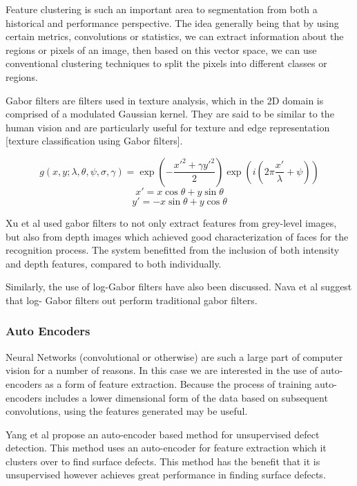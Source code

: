 \documentclass[a4]{article}
\begin{document}
Feature clustering is such an important area to segmentation from both a historical and performance perspective. The idea generally being that by using certain metrics, convolutions or statistics, we can extract information about the regions or pixels of an image, then based on this vector space, we can use conventional clustering techniques to split the pixels into different classes or regions. 

  

Gabor filters are filters used in texture analysis, which in the 2D domain is comprised of a modulated Gaussian kernel. They are said to be similar to the human vision \cite{jones1987evaluation} and are particularly useful for texture and edge representation [texture classification using Gabor filters]. 

$$g(x,y;\lambda,\theta,\psi,\sigma,\gamma)=\exp \left(-\frac{x'^2+\gamma y'^2}{2}\right) \exp \left( i\left(2\pi \frac{x'}{\lambda}+\psi\right) \right)$$
$$x' = x \cos\theta +y\sin\theta$$
$$y' = -x\sin\theta +y\cos\theta$$

  

Xu et al \cite{xu2009automatic} used gabor filters to not only extract features from grey-level images, but also from depth images which achieved good characterization of faces for the recognition process. The system benefitted from the inclusion of both intensity and depth features, compared to both individually. 

  

Similarly, the use of log-Gabor filters have also been discussed. Nava et al \cite{nava2011comparison} suggest that log- Gabor filters out perform traditional gabor filters. 

 
\subsubsection*{Auto Encoders}

Neural Networks (convolutional or otherwise) are such a large part of computer vision for a number of reasons. In this case we are interested in the use of auto-encoders as a form of feature extraction. Because the process of training auto-encoders includes a lower dimensional form of the data based on subsequent convolutions, using the features generated may be useful. 

  

Yang et al \cite{yang2019multiscale} propose an auto-encoder based method for unsupervised defect detection. This method uses an auto-encoder for feature extraction which it clusters over to find surface defects. This method has the benefit that it is unsupervised however achieves great performance in finding surface defects. 
\end{document}
